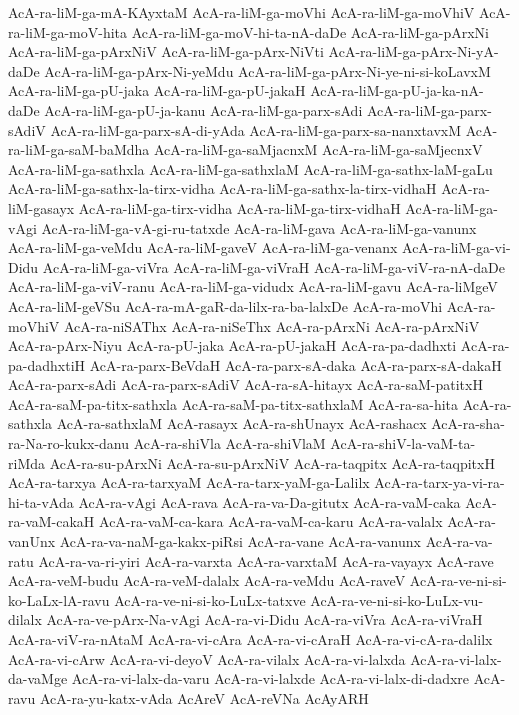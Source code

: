 {AcA-ra-liM-ga-mA-KAyxtaM
AcA-ra-liM-ga-moVhi
AcA-ra-liM-ga-moVhiV
AcA-ra-liM-ga-moV-hita
AcA-ra-liM-ga-moV-hi-ta-nA-daDe
AcA-ra-liM-ga-pArxNi
AcA-ra-liM-ga-pArxNiV
AcA-ra-liM-ga-pArx-NiVti
AcA-ra-liM-ga-pArx-Ni-yA-daDe
AcA-ra-liM-ga-pArx-Ni-yeMdu
AcA-ra-liM-ga-pArx-Ni-ye-ni-si-koLavxM
AcA-ra-liM-ga-pU-jaka
AcA-ra-liM-ga-pU-jakaH
AcA-ra-liM-ga-pU-ja-ka-nA-daDe
AcA-ra-liM-ga-pU-ja-kanu
AcA-ra-liM-ga-parx-sAdi
AcA-ra-liM-ga-parx-sAdiV
AcA-ra-liM-ga-parx-sA-di-yAda
AcA-ra-liM-ga-parx-sa-nanxtavxM
AcA-ra-liM-ga-saM-baMdha
AcA-ra-liM-ga-saMjacnxM
AcA-ra-liM-ga-saMjecnxV
AcA-ra-liM-ga-sathxla
AcA-ra-liM-ga-sathxlaM
AcA-ra-liM-ga-sathx-laM-gaLu
AcA-ra-liM-ga-sathx-la-tirx-vidha
AcA-ra-liM-ga-sathx-la-tirx-vidhaH
AcA-ra-liM-gasayx
AcA-ra-liM-ga-tirx-vidha
AcA-ra-liM-ga-tirx-vidhaH
AcA-ra-liM-ga-vAgi
AcA-ra-liM-ga-vA-gi-ru-tatxde
AcA-ra-liM-gava
AcA-ra-liM-ga-vanunx
AcA-ra-liM-ga-veMdu
AcA-ra-liM-gaveV
AcA-ra-liM-ga-venanx
AcA-ra-liM-ga-vi-Didu
AcA-ra-liM-ga-viVra
AcA-ra-liM-ga-viVraH
AcA-ra-liM-ga-viV-ra-nA-daDe
AcA-ra-liM-ga-viV-ranu
AcA-ra-liM-ga-vidudx
AcA-ra-liM-gavu
AcA-ra-liMgeV
AcA-ra-liM-geVSu
AcA-ra-mA-gaR-da-lilx-ra-ba-lalxDe
AcA-ra-moVhi
AcA-ra-moVhiV
AcA-ra-niSAThx
AcA-ra-niSeThx
AcA-ra-pArxNi
AcA-ra-pArxNiV
AcA-ra-pArx-Niyu
AcA-ra-pU-jaka
AcA-ra-pU-jakaH
AcA-ra-pa-dadhxti
AcA-ra-pa-dadhxtiH
AcA-ra-parx-BeVdaH
AcA-ra-parx-sA-daka
AcA-ra-parx-sA-dakaH
AcA-ra-parx-sAdi
AcA-ra-parx-sAdiV
AcA-ra-sA-hitayx
AcA-ra-saM-patitxH
AcA-ra-saM-pa-titx-sathxla
AcA-ra-saM-pa-titx-sathxlaM
AcA-ra-sa-hita
AcA-ra-sathxla
AcA-ra-sathxlaM
AcA-rasayx
AcA-ra-shUnayx
AcA-rashacx
AcA-ra-sha-ra-Na-ro-kukx-danu
AcA-ra-shiVla
AcA-ra-shiVlaM
AcA-ra-shiV-la-vaM-ta-riMda
AcA-ra-su-pArxNi
AcA-ra-su-pArxNiV
AcA-ra-taqpitx
AcA-ra-taqpitxH
AcA-ra-tarxya
AcA-ra-tarxyaM
AcA-ra-tarx-yaM-ga-Lalilx
AcA-ra-tarx-ya-vi-ra-hi-ta-vAda
AcA-ra-vAgi
AcA-rava
AcA-ra-va-Da-gitutx
AcA-ra-vaM-caka
AcA-ra-vaM-cakaH
AcA-ra-vaM-ca-kara
AcA-ra-vaM-ca-karu
AcA-ra-valalx
AcA-ra-vanUnx
AcA-ra-va-naM-ga-kakx-piRsi
AcA-ra-vane
AcA-ra-vanunx
AcA-ra-va-ratu
AcA-ra-va-ri-yiri
AcA-ra-varxta
AcA-ra-varxtaM
AcA-ra-vayayx
AcA-rave
AcA-ra-veM-budu
AcA-ra-veM-dalalx
AcA-ra-veMdu
AcA-raveV
AcA-ra-ve-ni-si-ko-LaLx-lA-ravu
AcA-ra-ve-ni-si-ko-LuLx-tatxve
AcA-ra-ve-ni-si-ko-LuLx-vu-dilalx
AcA-ra-ve-pArx-Na-vAgi
AcA-ra-vi-Didu
AcA-ra-viVra
AcA-ra-viVraH
AcA-ra-viV-ra-nAtaM
AcA-ra-vi-cAra
AcA-ra-vi-cAraH
AcA-ra-vi-cA-ra-dalilx
AcA-ra-vi-cArw
AcA-ra-vi-deyoV
AcA-ra-vilalx
AcA-ra-vi-lalxda
AcA-ra-vi-lalx-da-vaMge
AcA-ra-vi-lalx-da-varu
AcA-ra-vi-lalxde
AcA-ra-vi-lalx-di-dadxre
AcA-ravu
AcA-ra-yu-katx-vAda
AcAreV
AcA-reVNa
AcAyARH
}
